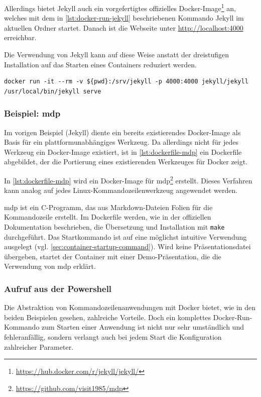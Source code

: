 Allerdings bietet Jekyll auch ein vorgefertigtes offizielles Docker-Image\footnote{\url{https://hub.docker.com/r/jekyll/jekyll/}} an, welches mit dem in \cref{lst:docker-run-jekyll} beschriebenen Kommando Jekyll im aktuellen Ordner startet.
Danach ist die Webseite unter \url{http://localhost:4000} erreichbar.

Die Verwendung von Jekyll kann auf diese Weise anstatt der dreistufigen Installation auf das Starten eines Containers reduziert werden.

\begin{lstlisting}[caption=Docker-Kommando zum Starten von Jekyll, label=lst:docker-run-jekyll]
docker run -it --rm -v ${pwd}:/srv/jekyll -p 4000:4000 jekyll/jekyll /usr/local/bin/jekyll serve
\end{lstlisting}

\subsubsection{Beispiel: mdp}
Im vorigen Beispiel (Jekyll) diente ein bereits existierendes Docker-Image als Basis für ein plattformunabhängiges Werkzeug.
Da allerdings nicht für jedes Werkzeug ein Docker-Image existiert, ist in \cref{lst:dockerfile-mdp} ein Dockerfile abgebildet, der die Portierung eines existierenden Werkzeuges für Docker zeigt.


In \cref{lst:dockerfile-mdp} wird ein Docker-Image für mdp\footnote{\url{https://github.com/visit1985/mdp}} erstellt.
Dieses Verfahren kann analog auf jedes Linux-Kommandozeilenwerkzeug angewendet werden.

mdp ist ein C-Programm, das aus Markdown-Dateien Folien für die Kommandozeile erstellt.
Im Dockerfile werden, wie in der offiziellen Dokumentation beschrieben, die Übersetzung und Installation mit \texttt{make} durchgeführt.
Das Startkommando ist auf eine möglichst intuitive Verwendung ausgelegt (vgl. \cref{sec:container-startup-command}).
Wird keine Präsentationsdatei übergeben, startet der Container mit einer Demo-Präsentation, die die Verwendung von mdp erklärt.


\subsubsection{Aufruf aus der Powershell}
Die Abstraktion von Kommandozeilenanwendungen mit Docker bietet, wie in den beiden Beispielen gesehen, zahlreiche Vorteile.
Doch ein komplettes Docker-Run-Kommando zum Starten einer Anwendung ist nicht nur sehr umständlich und fehleranfällig, sondern verlangt auch bei jedem Start die Konfiguration zahlreicher Parameter.


